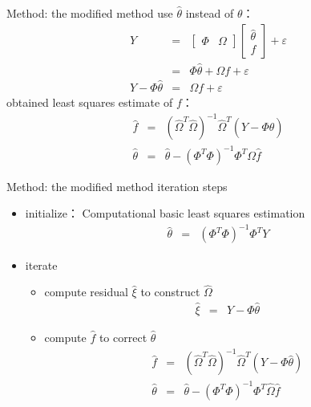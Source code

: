 \begin{frame}{ Method: the modified method }
use $\hat\theta$ instead of $\theta$：
\begin{eqnarray*}
Y &=& \begin{bmatrix} \Phi & \Omega \end{bmatrix} \begin{bmatrix}\hat\theta \\ f \end{bmatrix} + \varepsilon \\
&=& \Phi \hat\theta+ \Omega  f  + \varepsilon \\
Y- \Phi \hat\theta &=& \Omega f  + \varepsilon 
\end{eqnarray*}
obtained least squares estimate of $f $：
\begin{eqnarray*}
\hat f &=& (\hat\Omega^T \hat\Omega)^{-1}\hat\Omega^T(Y- \Phi \hat\theta) \\
\hat\theta &=& \hat\theta-(\Phi^T\Phi)^{-1} \Phi^T \Omega \hat f
\end{eqnarray*}
\end{frame}

\begin{frame}{ Method: the modified method  iteration steps }
\begin{itemize}
\item initialize： Computational basic least squares estimation 
\begin{eqnarray*}
\hat\theta &=& (\Phi^T\Phi)^{-1} \Phi^T Y
\end{eqnarray*}
\item iterate
\begin{itemize}
\item compute residual $\hat\xi$ to construct $\hat\Omega$
\begin{eqnarray*}
\hat\xi &=& Y- \Phi\hat\theta
\end{eqnarray*}
\item compute $\hat f$ to correct $\hat\theta$
\begin{eqnarray*}
\hat f &=& (\hat\Omega^T \hat\Omega)^{-1}\hat\Omega^T(Y- \Phi \hat\theta) \\
\hat\theta &=& \hat\theta-(\Phi^T\Phi)^{-1} \Phi^T \hat\Omega \hat f
\end{eqnarray*}
\end{itemize}
\end{itemize}
\end{frame}

